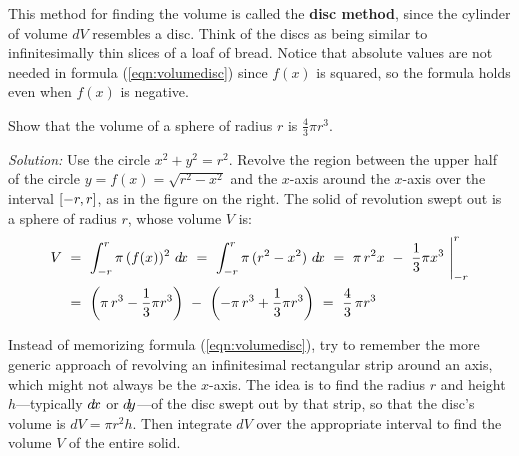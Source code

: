 \noindent This method for finding the volume is called the \textbf{disc method},
since the cylinder of volume $d\!V$ resembles a disc. Think of the discs as
being similar to infinitesimally thin slices of a loaf of bread. Notice that
absolute values are not needed in formula (\ref{eqn:volumedisc}) since $f(x)$ is
squared, so the formula holds even when $f(x)$ is negative.
\newpage
\begin{exmp}
\noindent Show that the volume of a sphere of radius $r$ is
$\frac{4}{3} \pi r^3$.\vspace{0.5mm}
\par\noindent\emph{Solution:} Use the circle $x^2+y^2=r^2$. Revolve the region
between the upper half of the circle $y=f(x)=\sqrt{r^2-x^2}$ and the $x$-axis
around the $x$-axis over the interval $\lbrack -r,r \rbrack$, as in the figure on the
right. The solid of revolution swept out is a sphere of radius $r$, whose volume
$V$ is:
\begin{align*}
V ~&=~ \int_{-r}^r \pi\,(f(x))^2~d\!x ~=~
       \int_{-r}^r \pi\,(r^2-x^2)~d\!x ~=~
       \pi\,r^2 x ~-~ \frac{1}{3} \pi x^3~\Biggr|_{-r}^r\\
&=~    \left(\pi\,r^3 - \frac{1}{3} \pi r^3\right) ~-~ \left(-\pi\,r^3 + \frac{1}{3} \pi r^3\right)
~=~ \frac{4}{3}\,\pi r^3 \quad\relax
\end{align*}
\end{exmp}
\divider
\vspace{2mm}

Instead of memorizing formula (\ref{eqn:volumedisc}), try to remember the more
generic approach of revolving an infinitesimal rectangular strip around an axis,
which might not always be the $x$-axis. The idea is to find the radius $r$ and height
$h$---typically $d\!x$ or $d\!y$---of the disc swept out by that strip, so that
the disc's volume is $d\!V = \pi r^2 h$. Then integrate $d\!V$ over the
appropriate interval to find the volume $V$ of the entire solid.

